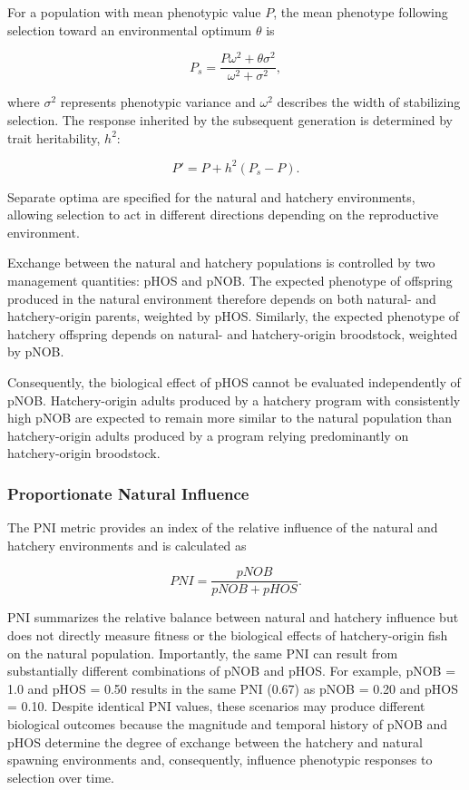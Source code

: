 \documentclass[12pt,letterpaper]{article}
\begin{document}
For a population with mean phenotypic value \(P\), the mean phenotype following selection toward an environmental optimum \(\theta\) is

\[
P_s =
\frac{P\omega^2 + \theta\sigma^2}
     {\omega^2 + \sigma^2},
\]

where \(\sigma^2\) represents phenotypic variance and \(\omega^2\) describes the width of stabilizing selection. The response inherited by the subsequent generation is determined by trait heritability, \(h^2\):

\[
P' = P + h^2(P_s-P).
\]

Separate optima are specified for the natural and hatchery environments, allowing selection to act in different directions depending on the reproductive environment.

Exchange between the natural and hatchery populations is controlled by two management quantities: pHOS and pNOB. The expected phenotype of offspring produced in the natural environment therefore depends on both natural- and hatchery-origin parents, weighted by pHOS. Similarly, the expected phenotype of hatchery offspring depends on natural- and hatchery-origin broodstock, weighted by pNOB.

Consequently, the biological effect of pHOS cannot be evaluated independently of pNOB. Hatchery-origin adults produced by a hatchery program with consistently high pNOB are expected to remain more similar to the natural population than hatchery-origin adults produced by a program relying predominantly on hatchery-origin broodstock.

\subsubsection{Proportionate Natural Influence}\label{proportionate-natural-influence}

The PNI metric provides an index of the relative influence of the natural and hatchery environments and is calculated as

\[
PNI =
\frac{pNOB}
     {pNOB+pHOS}.
\]

PNI summarizes the relative balance between natural and hatchery influence but does not directly measure fitness or the biological effects of hatchery-origin fish on the natural population. Importantly, the same PNI can result from substantially different combinations of pNOB and pHOS. For example, pNOB = 1.0 and pHOS = 0.50 results in the same PNI (0.67) as pNOB = 0.20 and pHOS = 0.10. Despite identical PNI values, these scenarios may produce different biological outcomes because the magnitude and temporal history of pNOB and pHOS determine the degree of exchange between the hatchery and natural spawning environments and, consequently, influence phenotypic responses to selection over time.
\end{document}
